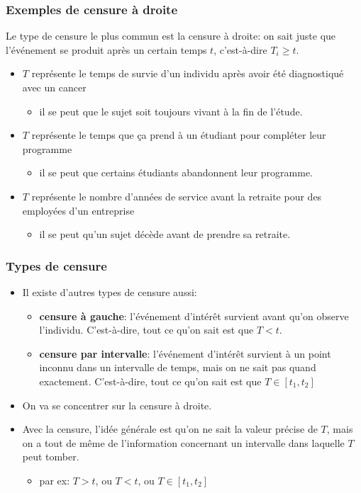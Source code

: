 \documentclass{beamer}
\begin{document}
\begin{frame}
\frametitle{Exemples de censure à droite}
 Le type de censure le plus commun est la \alert{censure à droite}: on sait juste que l'événement se produit après un certain temps $t$, c'est-à-dire $T_i \geq t$.

\begin{itemize}
\vp \vp
\item $T$ représente le temps de survie d'un individu après avoir été diagnostiqué avec un cancer
\begin{itemize} \item il se peut que le sujet soit toujours vivant à la fin de l'étude.
\end{itemize}
\item $T$ représente le temps que ça prend à un étudiant pour compléter leur programme 
\begin{itemize} \item
il se peut que certains étudiants abandonnent leur programme.
\end{itemize}
\item $T$ représente le nombre d'années de service avant la retraite pour des employées d'un entreprise 
\begin{itemize} \item il se peut qu'un sujet décède avant de prendre sa retraite. 
\end{itemize}
\end{itemize}

\end{frame}


\begin{frame}
\frametitle{Types de censure}
\begin{itemize}
\item Il existe d'autres types de censure aussi:
\begin{itemize}
\vp \vp
\item \textbf{censure à gauche}: l'événement d'intérêt survient avant qu'on observe l'individu. C'est-à-dire, tout ce qu'on sait est que $T<t$.
\item \textbf{censure par intervalle}: l'événement d'intérêt survient à un point inconnu dans un intervalle de temps, mais on ne sait pas quand exactement. C'est-à-dire, tout ce qu'on sait est que $T \in [t_1,t_2]$
\end{itemize}
\item On va se concentrer sur la censure à droite. 
\item Avec la censure, l'idée générale est qu'on ne sait la valeur précise de $T$, mais on a tout de même de l'information concernant un intervalle dans laquelle $T$ peut tomber.
\begin{itemize}
\vp \vp
\item par ex: $T>t$, ou $T<t$, ou $T \in [t_1,t_2]$
\end{itemize}
\end{itemize}
\end{frame}
\end{document}
